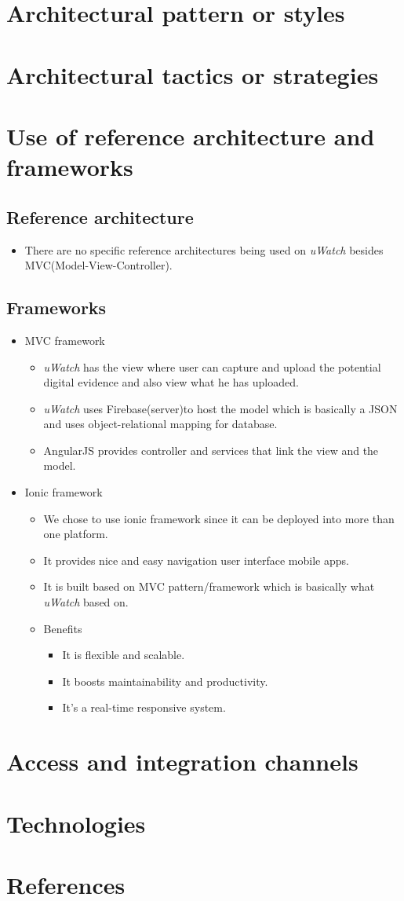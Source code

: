 \documentclass[a4paper,12pt]{article}
\begin{document}
\section{Architectural pattern or styles}
\section{Architectural tactics or strategies}
\section{Use of reference architecture and frameworks}
\subsection{Reference architecture}
	\begin{itemize}
		\item There are no specific reference architectures being used on \textit{uWatch} besides MVC(Model-View-Controller).
	\end{itemize}
\subsection{Frameworks}
		\begin{itemize}
			\item MVC framework
				\begin{itemize}
					\item \textit{uWatch} has the view where user can capture and upload the potential digital evidence and also view what he has uploaded.
					\item \textit{uWatch} uses Firebase(server)to host the model which is basically a JSON and uses object-relational mapping for database.
					\item AngularJS provides controller and services that link the view and the model.
				\end{itemize}
			\item Ionic framework
				\begin{itemize}
					\item We chose to use ionic framework since it can be deployed into more than one platform.
					\item It provides nice and easy navigation user interface mobile apps.
					\item It is built based on MVC pattern/framework which is basically what      \textit{uWatch} based on.
					\item Benefits
						\begin{itemize}
							\item It is flexible and scalable.
							\item It boosts maintainability and productivity.
							\item It's a real-time responsive system.
						\end{itemize}
				\end{itemize}
		\end{itemize}
\section{Access and integration channels}
\section{Technologies}
\section{References}
\end{document}
